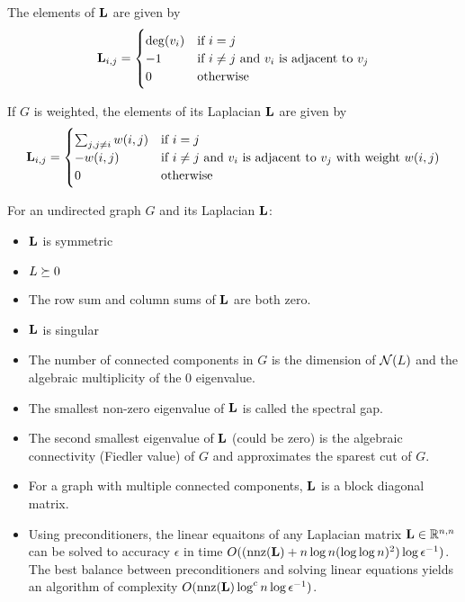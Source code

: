 The elements of $\mathbf{L}$ are given by
\begin{equation}
\mathbf{L}_{i,j} = \begin{cases}
  \deg(v_i) & \textrm{if $i=j$} \\
  -1        & \textrm{if $i\ne j$ and $v_i$ is adjacent to $v_j$} \\
   0        & \textrm{otherwise}
\end{cases}
\end{equation}

If $G$ is weighted, the elements of its Laplacian $\mathbf{L}$ are given by
\begin{equation}
\mathbf{L}_{i,j} = \begin{cases}
  \sum_{j,j\ne i} w(i,j) & \textrm{if $i=j$} \\
  -w(i,j)   & \textrm{if $i\ne j$ and $v_i$ is adjacent to $v_j$ with weight $w(i,j)$} \\
   0        & \textrm{otherwise}
\end{cases}
\end{equation}

For an undirected graph $G$ and its Laplacian $\mathbf{L}$:
\begin{itemize}
\item $\mathbf{L}$ is symmetric
\item $L\succeq 0$
\item The row sum and column sums of $\mathbf{L}$ are both zero.
\item $\mathbf{L}$ is singular
\item The number of connected components in $G$ is the dimension of $\mathcal{N}(L)$ and the algebraic multiplicity of the 0 eigenvalue.
\item The smallest non-zero eigenvalue of $\mathbf{L}$ is called the spectral gap.
\item The second smallest eigenvalue of $\mathbf{L}$ (could be zero) is the algebraic connectivity (Fiedler value) of $G$ and approximates the sparest cut of $G$.
\item For a graph with multiple connected components, $\mathbf{L}$ is a block diagonal matrix.
\item Using preconditioners, the linear equaitons of any Laplacian matrix $\mathbf{L}\in\mathbb{R}^{n,n}$ can be solved to accuracy $\epsilon$ in time $O((\operatorname{nnz}(\mathbf{L}) + n\log n (\log \log n)^2) \log \epsilon^{-1})$. The best balance between preconditioners and solving linear equations yields an algorithm of complexity $O(\operatorname{nnz}(\mathbf{L}) \log^c n \log \epsilon^{-1})$.~\citep{Spielman2010}
\end{itemize}

